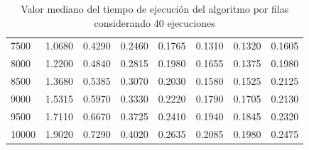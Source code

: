 \documentclass{report}
\begin{document}
\begin{appendices}
\begin{table}[H]
\begin{tabular}{lrrrrrrr}
7500             &      1.0680 &  0.4290 &  0.2460 &  0.1765 &  0.1310 &  0.1320 &  0.1605 \\
8000             &      1.2200 &  0.4840 &  0.2815 &  0.1980 &  0.1655 &  0.1375 &  0.1980 \\
8500             &      1.3680 &  0.5385 &  0.3070 &  0.2030 &  0.1580 &  0.1525 &  0.2125 \\
9000             &      1.5315 &  0.5970 &  0.3330 &  0.2220 &  0.1790 &  0.1705 &  0.2130 \\
9500             &      1.7110 &  0.6670 &  0.3725 &  0.2410 &  0.1940 &  0.1845 &  0.2320 \\
10000            &      1.9020 &  0.7290 &  0.4020 &  0.2635 &  0.2085 &  0.1980 &  0.2475 \\
\bottomrule
\end{tabular}
\caption{Valor mediano del tiempo de ejecución del algoritmo por filas
  considerando 40 ejecuciones}
\label{table:squares-alg1-data}
\end{table}

\begin{table}[H]


\end{table}
\end{appendices}
\end{document}
